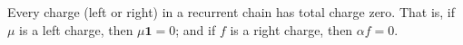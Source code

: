 Every charge (left or right) in a recurrent chain has total charge zero. That is, if $\mu$ is a left charge, then $\mu \mathbf{1} = 0$; and if $f$ is a right charge, then $\alpha f = 0$.
